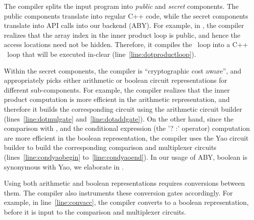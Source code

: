 The compiler splits the input
program into \emph{public} and \emph{secret} components. The public
components translate into regular C++ code, while the secret
components translate into API calls into our \mpc backend
(ABY). For example, in , the \tool
compiler realizes that the array index  in the inner product loop
is public, and hence the access locations need not be hidden.
Therefore, it compiles the ~loop into a C++
~loop that will be executed in-clear
(line~\ref{line:dotproductloop}).

Within the secret components, the \tool compiler is ``cryptographic
cost aware'', and appropriately picks either arithmetic or boolean
circuit representations for different sub-components. For example,
the compiler realizes that the inner product computation is more
efficient in the arithmetic representation, and therefore it builds
the corresponding circuit using the arithmetic circuit builder
 (lines~\ref{line:dotmulgate} and~\ref{line:dotaddgate}). On
the other hand, since the comparison with , and the conditional
expression (the '? :' operator) computation are more efficient in the
boolean representation, the \tool compiler uses the Yao circuit
builder  to build the corresponding comparison and
multiplexer circuits
(lines~\ref{line:condyaobegin} to~\ref{line:condyaoend}). In our usage
of ABY, boolean is synonymous with Yao, we elaborate in
.


Using both arithmetic and boolean representations requires conversions between them.
The \tool compiler also
instruments these conversion gates accordingly. For example, in
line~\ref{line:convacc}, the compiler converts
 to a boolean representation, before it is
input to the comparison and multiplexer circuits.

